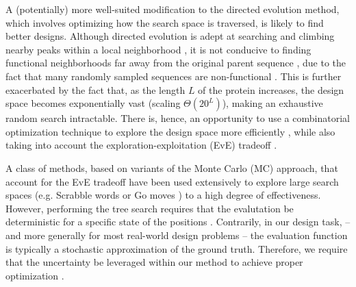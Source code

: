 \documentclass{article}
\begin{document}
A (potentially) more well-suited modification to the directed evolution method,
which involves optimizing how the search space is traversed, is likely to find
better designs. Although directed evolution is adept at searching and climbing
nearby peaks within a local neighborhood \cite{romero2009exploring}, it is not
conducive to finding functional neighborhoods far away from the original parent
sequence \cite{pokusaeva2017experimental}, due to the fact that many randomly
sampled sequences are non-functional \cite{keefe2001functional, du2016good}.
This is further exacerbated by the fact that, as the length $L$ of the protein
increases, the design space becomes exponentially vast (scaling $\Theta
(20^L)$), making an exhaustive random search intractable. There is, hence, an
opportunity to use a combinatorial optimization technique to explore the design
space more efficiently \cite{baluja1997using, schneider1997search}, while also
taking into account the exploration-exploitation (EvE) tradeoff
\cite{chen2009optimal, sabharwal2012guiding}.

A class of methods, based on variants of the Monte Carlo (MC) approach, that
account for the EvE tradeoff have been used extensively to explore large search
spaces (e.g. Scrabble words \cite{sheppard2002world} or Go moves
\cite{gelly2012grand, silver2017mastering}) to a high degree of effectiveness.
However, performing the tree search requires that the evalutation be
deterministic for a specific state of the positions \cite{gelly2006exploration}.
Contrarily, in our design task, -- and more generally for most real-world design
problems -- the evaluation function is typically a stochastic approximation of
the ground truth. Therefore, we require that the uncertainty be leveraged within
our method to achieve proper optimization \cite{brookes2018design}. 
\end{document}
